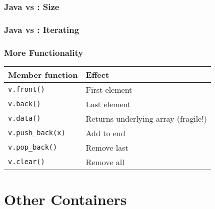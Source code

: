 \begin{frame}
  \frametitle{Java vs \cpp: Size}
  \vskip2mm
  \structure{\cpp}
\end{frame}

\begin{frame}
  \frametitle{Java vs \cpp: Iterating}
  \vskip2mm
  \structure{\cpp}
\end{frame}

\begin{frame}
  \frametitle{More Functionality}
  \begin{center}
    \begin{tabular}{ll}
      \textbf{Member function} & \textbf{Effect} \\
      \toprule
      \texttt{v.front()}       & First element \\
      \texttt{v.back()}        & Last element \\
      \texttt{v.data()}        & Returns underlying array (fragile!) \\
      \texttt{v.push\_back(x)} & Add to end \\
      \texttt{v.pop\_back()}   & Remove last \\
      \texttt{v.clear()}       & Remove all \\
    \end{tabular}
  \end{center}
\end{frame}


\section{Other Containers}

\frame{\tableofcontents[currentsection]}

